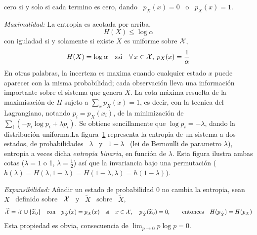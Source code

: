 \begin{propiedades}
  cero si y solo si  cada termino es cero, dando \ $p_X(x) = 0$  \ o \ $p_X(x) =
  1$.
%
\setcounter{PropCotamaxima}{\value{enumi}}
\item\label{prop:SZ:cotamaxima}  {\it Maximalidad:} La  entropia es  acotada por
  arriba,
  \[
  H(X) \le \log \alpha
  \]
  con iguladad si y solamente si existe $X$ es uniforme sobre $\mathcal{X}$, \ie
  \[
  H(X) =  \log \alpha \quad \mbox{ssi}  \quad \forall \,  x \in \mathcal{X}, \:  p_X(x) =
  \frac{1}{\alpha}
  \]
  En otras  palabras, la incerteza es  maxima cuando cualquier  estado $x$ puede
  aparecer con la misma probabilidad; cada observaci\'on lleva una informaci\'on
  importante sobre el  sistema que genera $X$.  La cota  m\'axima resuelta de la
  maximisaci\'on de $H$  sujeto a $\sum_x p_X(x) = 1$, es  decir, con la tecnica
  del Lagrangiano, notando $p_i =  p_X(x_i)$, de la minimizaci\'on de $\sum_i (-
  p_i  \log p_i  + \lambda  p_i)$.   Se obtiene  sencillamente que  $\log p_i  =
  -\lambda$,      dando     la      distribuci\'on      uniforma.\newline     La
  figura~\ref{fig:SZ:EntropiaBinaria} representa la entropia de un sistema a dos
  estados, de probabilidades  \ $\lambda$ \ y \ $1-\lambda$  \ (lei de Bernoulli
  de parametro  $\lambda$), entropia  a veces dicha  {\it entropia  binaria}, en
  funci\'on de $\lambda$.   Esta figura ilustra ambas cotas ($\lambda  = 1$ o 1,
  $\lambda  =  \frac12$)  as\'i   que  la  invariancia  bajo  una  permutaci\'on
  ($h(\lambda) = H(\lambda,1-\lambda) = H(1-\lambda,\lambda) = h(1-\lambda)$).
  \begin{figure}[h!]
  \begin{center}\end{center}
  \label{fig:SZ:EntropiaBinaria}
  \end{figure}
%
\item\label{prop:SZ:expansabilidad} {\it Expansibilidad:}  A\~nadir un estado de
  probabilidad 0 no cambia la entropia, \ie sean \ $X$ \ definido sobre \ $\mathcal{X}$ \
  y \ $\widetilde{X}$ \ sobre \ $\widetilde{X}$,
  \[
  \widetilde{\mathcal{X}}  =  \mathcal{X}  \cup  \{  \widetilde{x}_0  \}  \quad  \mbox{con}  \quad
  p_{\widetilde{X}}(x)   =   p_X(x)   \quad   \mbox{si}   \quad  x   \in   \mathcal{X},   \quad
  p_{\widetilde{X}}(\widetilde{x}_0)    =    0,    \qquad   \mbox{entonces}    \quad
  H(p_{\widetilde{X}}) = H(p_X)
  \]
  Esta propiedad es obvia, consecuencia de $\lim_{p \to 0} p \log p = 0$.

\end{propiedades}
